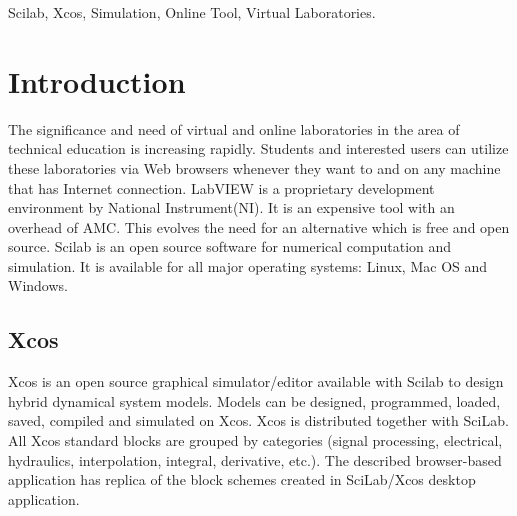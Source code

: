 \documentclass[conference]{IEEEtran}
\begin{document}
\begin{IEEEkeywords}
Scilab, Xcos, Simulation, Online Tool, Virtual Laboratories.
\end{IEEEkeywords}






%
\IEEEpeerreviewmaketitle



\section{Introduction}
The significance and need of virtual and online laboratories in the area of technical education is increasing rapidly. Students
and interested users can utilize these laboratories via Web browsers whenever they want to and on any machine that has Internet connection.  
LabVIEW is a proprietary development environment by National Instrument(NI). It is an expensive tool with an overhead of AMC. This evolves the need for an alternative which is free and open source. Scilab is an open source software for numerical computation and simulation. It is available for all major operating systems: Linux, Mac OS and Windows.
\subsection{Xcos}
Xcos is an open source graphical simulator/editor available with Scilab to design hybrid dynamical system models. Models can be designed, programmed, loaded, saved, compiled and simulated on Xcos. Xcos is distributed together with SciLab. All Xcos standard blocks are grouped by categories (signal processing, electrical, hydraulics, interpolation, integral, derivative, etc.). The described browser-based application has replica of the block schemes created in SciLab/Xcos desktop application.
\end{document}
